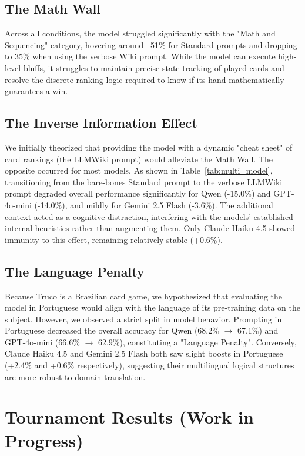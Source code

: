 \documentclass[11pt]{article}
\begin{document}
\subsection{The Math Wall}
Across all conditions, the model struggled significantly with the "Math and Sequencing" category, hovering around ~51\% for Standard prompts and dropping to 35\% when using the verbose Wiki prompt. While the model can execute high-level bluffs, it struggles to maintain precise state-tracking of played cards and resolve the discrete ranking logic required to know if its hand mathematically guarantees a win.

\subsection{The Inverse Information Effect}
We initially theorized that providing the model with a dynamic "cheat sheet" of card rankings (the LLMWiki prompt) would alleviate the Math Wall. The opposite occurred for most models. As shown in Table~\ref{tab:multi_model}, transitioning from the bare-bones Standard prompt to the verbose LLMWiki prompt degraded overall performance significantly for Qwen (-15.0\%) and GPT-4o-mini (-14.0\%), and mildly for Gemini 2.5 Flash (-3.6\%). The additional context acted as a cognitive distraction, interfering with the models' established internal heuristics rather than augmenting them. Only Claude Haiku 4.5 showed immunity to this effect, remaining relatively stable (+0.6\%).

\subsection{The Language Penalty}
Because Truco is a Brazilian card game, we hypothesized that evaluating the model in Portuguese would align with the language of its pre-training data on the subject. However, we observed a strict split in model behavior. Prompting in Portuguese decreased the overall accuracy for Qwen (68.2\% $\to$ 67.1\%) and GPT-4o-mini (66.6\% $\to$ 62.9\%), constituting a "Language Penalty". Conversely, Claude Haiku 4.5 and Gemini 2.5 Flash both saw slight boosts in Portuguese (+2.4\% and +0.6\% respectively), suggesting their multilingual logical structures are more robust to domain translation.

\section{Tournament Results (Work in Progress)}
\end{document}

